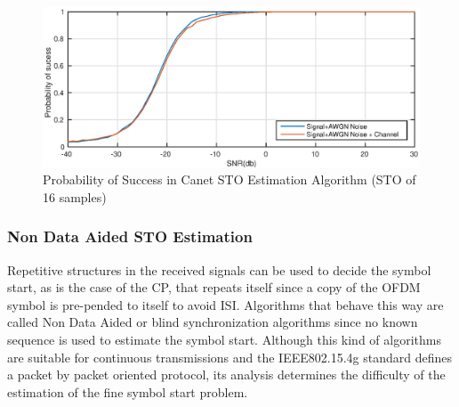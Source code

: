 \begin{figure}[hbt]
  \centering
    \includegraphics[width=1\textwidth]
      {./figures/fine_sto_canet_16.eps}
  \caption{Probability of Success in Canet STO Estimation Algorithm (STO of 16 samples)}
  \label{fig:xcorr_sfo_exm_canet}
\end{figure}






\subsubsection{Non Data Aided STO Estimation}
Repetitive structures in the received signals can be used to decide the symbol start, as is the case of the CP, that repeats itself since a copy of the OFDM symbol is pre-pended to itself to avoid ISI. Algorithms that behave this way are called Non Data Aided or blind synchronization algorithms since no known sequence is used to estimate the symbol start. Although this kind of algorithms are suitable for continuous transmissions and the IEEE802.15.4g standard defines a packet by packet oriented protocol, its analysis determines the difficulty of the estimation of the fine symbol start problem.   


